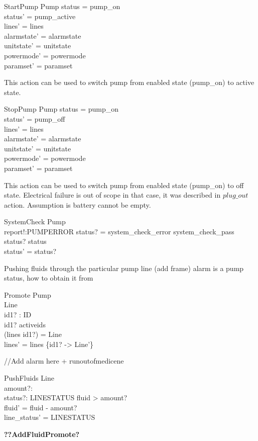 \documentclass{article}
\begin{document}
	\begin{schema}{StartPump}
		\Delta Pump
	\where
		status = pump\_on \\ 
		status' = pump\_active \\
		lines' = lines  \\
    	alarmstate' = alarmstate \\
    	unitstate' = unitstate \\
    	powermode' = powermode \\
		paramset' = paramset
	\end{schema}
	
	This action can be used to switch pump from enabled state (pump\_on) to active state.
	
	\begin{schema}{StopPump}
		\Delta Pump
	\where
		status = pump\_on \\ 
		status' = pump\_off \\
		lines' = lines  \\
    	alarmstate' = alarmstate \\
    	unitstate' = unitstate \\
    	powermode' = powermode \\
		paramset' = paramset
	\end{schema}	
			
	This action can be used to switch pump from enabled state (pump\_on) to off state. Electrical failure is out of scope in that case, it was described 
	in $plug\_out$ action. Assumption is battery cannot be empty.		
			
	\begin{schema}{SystemCheck}
		\Delta Pump\\
		report!:PUMPERROR
	\where 
		status? = system\_check\_error \lor system\_check\_pass \\
		status? \neq status\\
		status' = status?
	\end{schema}
	
	
	Pushing fluids through the particular pump line (add frame) alarm is a pump status, how to obtain it from
	
	\begin{schema}{Promote}
		\Delta Pump	\\
		\Delta Line \\
		id1? : ID \\
	\where 
		id1? \in activeids \\
		(lines id1?) = \theta Line \\
		lines' = lines \oplus \{id1? -> \theta Line'\} \\		
	\end{schema}
	
	//Add alarm here + runoutofmedicene
	\begin{schema}{PushFluids}
		\Delta Line \\
		amount?: \nat \\
		status?: LINESTATUS
	\where 
		fluid > amount? \\
		fluid' = fluid - amount? \\
		line_status' = LINESTATUS
	\end{schema}
	
	\textbf{??AddFluidPromote?}
\end{document}
